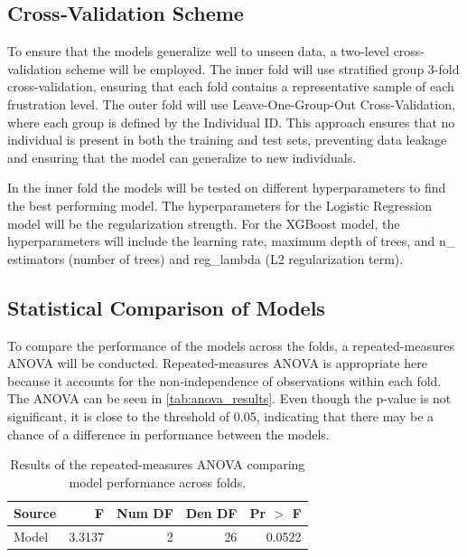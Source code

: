 	\subsection{Cross‐Validation Scheme}
	To ensure that the models generalize well to unseen data, a two-level cross-validation scheme will be employed.
	The inner fold will use stratified group 3-fold cross-validation, ensuring that each fold contains a representative
		sample of each frustration level.
	The outer fold will use Leave-One-Group-Out Cross-Validation, where each group is defined by the Individual ID\@.
	This approach ensures that no individual is present in both the training and test sets, preventing data leakage and
		ensuring that the model can generalize to new individuals.
		
	In the inner fold the models will be tested on different hyperparameters to find the best performing model.
		The hyperparameters for the Logistic Regression model will be the regularization strength.
		For the XGBoost model, the hyperparameters will include the learning rate, maximum depth of trees, and n\_
		estimators (number of trees) and reg\_lambda (L2 regularization term).


	\subsection{Statistical Comparison of Models}
	To compare the performance of the models across the folds, a repeated-measures ANOVA will be conducted.
		Repeated-measures ANOVA is appropriate here because it accounts for the non‐independence of observations
	within each fold.
	The ANOVA can be seen in \autoref{tab:anova_results}.
	Even though the p-value is not significant, it is close to the threshold of 0.05, indicating that there may be a
		chance of a difference in performance between the models.

		\begin{table}[ht]
			\centering
			\begin{tabular}{@{}lrrrr@{}}
				\toprule
				\textbf{Source} & \textbf{F} & \textbf{Num DF} & \textbf{Den DF} & \textbf{Pr $>$ F} \\
				\midrule
				Model           & 3.3137       & 2               & 26               & 0.0522            \\
				\bottomrule
			\end{tabular}
			\caption{Results of the repeated-measures ANOVA comparing model performance across folds.}
			\label{tab:anova_results}
		\end{table}



